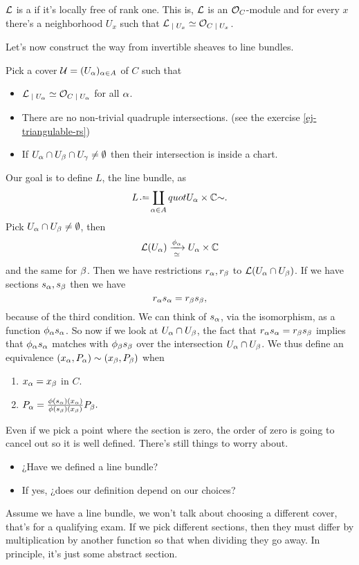 \documentclass[12pt]{memoir}
\begin{document}
\begin{Def}
    $\mathcal{L}$ is a  if it's locally free of rank one. This is, $\mathcal{L}$ is an $\mathcal{O}_C$-module and for every $x$ there's a neighborhood $U_x$ such that $\cL_{\mid U_x}\isom \cO_{C\mid U_x}$. 
\end{Def}

Let's now construct the way from invertible sheaves to line bundles.

\begin{ptcb}
Pick a cover $\mathcal{U}=(U_\alpha)_{\alpha\in A}$ of $C$ such that
\begin{itemize}
    \item $\cL_{\mid U_\al}\isom\cO_{C\mid U_\al}$ for all $\alpha$.
    \item There are no non-trivial quadruple intersections. (see the exercise \ref{ej-triangulable-rs})
    \item If $U_\alpha\cap U_\beta\cap U_\gamma\neq\emptyset$ then their intersection is inside a chart.
\end{itemize}
Our goal is to define $L$, the line bundle, as 
$$L\defeq \coprod_{\al\in A}quot{U_\al\x\bC}{\sim}.$$
Pick $U_\alpha\cap U_\beta\neq\emptyset$, then 
$$\mathcal{L}(U_\alpha)\xrightarrow[\simeq]{\phi_\alpha}U_\alpha\times\mathbb{C}$$
and the same for $\beta$. Then we have restrictions $r_\alpha,r_\beta$ to $\mathcal{L}(U_\alpha\cap U_\beta)$. If we have sections $s_\alpha,s_\beta$ then we have 
$$r_\alpha s_\alpha=r_\beta s_\beta,$$
because of the third condition. We can think of $s_\alpha$, via the isomorphism, as a function $\phi_\alpha s_\alpha$. So now if we look at $U_\alpha\cap U_\beta$, the fact that $r_\alpha s_\alpha=r_\beta s_\beta$ implies that $\phi_\alpha s_\alpha$ matches with $\phi_\beta s_\beta$ over the intersection $U_\alpha\cap U_\beta$. We thus define an equivalence $(x_\alpha,P_\alpha)\sim(x_\beta,P_\beta)$ when 
\begin{enumerate}
    \item $x_\alpha=x_\beta$ in $C$.
    \item $P_\alpha=\frac{\phi(s_\alpha)(x_\alpha)}{\phi(s_\beta)(x_\beta)}P_\beta.$
\end{enumerate}
Even if we pick a point where the section is zero, the order of zero is going to cancel out so it is well defined. There's still things to worry about. 
\begin{itemize}
    \item ¿Have we defined a line bundle?
    \item If yes, ¿does our definition depend on our choices?
\end{itemize}
Assume we have a line bundle, we won't talk about choosing a different cover, that's for a qualifying exam. If we pick different sections, then they must differ by multiplication by another function so that when dividing they go away. In principle, it's just some abstract section.\par

\end{ptcb}
\end{document}
